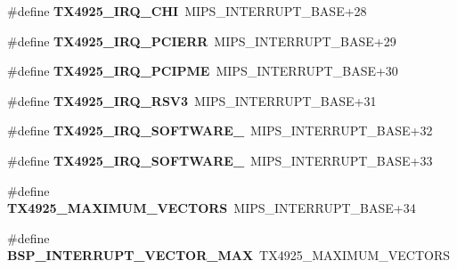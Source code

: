 \begin{DoxyCompactItemize}
\#define {\bfseries T\+X4925\+\_\+\+I\+R\+Q\+\_\+\+C\+HI}~M\+I\+P\+S\+\_\+\+I\+N\+T\+E\+R\+R\+U\+P\+T\+\_\+\+B\+A\+SE+28
\item 
\mbox{\label{group__bsp__interrupt_ga0ef296517039f7d75214c2108f10d716}} 
\#define {\bfseries T\+X4925\+\_\+\+I\+R\+Q\+\_\+\+P\+C\+I\+E\+RR}~M\+I\+P\+S\+\_\+\+I\+N\+T\+E\+R\+R\+U\+P\+T\+\_\+\+B\+A\+SE+29
\item 
\mbox{\label{group__bsp__interrupt_ga5e43a96e8331dd878c89236eb999cbb0}} 
\#define {\bfseries T\+X4925\+\_\+\+I\+R\+Q\+\_\+\+P\+C\+I\+P\+ME}~M\+I\+P\+S\+\_\+\+I\+N\+T\+E\+R\+R\+U\+P\+T\+\_\+\+B\+A\+SE+30
\item 
\mbox{\label{group__bsp__interrupt_gaf8b8981d932d03a544c6e36b7358de58}} 
\#define {\bfseries T\+X4925\+\_\+\+I\+R\+Q\+\_\+\+R\+S\+V3}~M\+I\+P\+S\+\_\+\+I\+N\+T\+E\+R\+R\+U\+P\+T\+\_\+\+B\+A\+SE+31
\item 
\mbox{\label{group__bsp__interrupt_gac11a3236c9c6721ab92f357ca16b8afa}} 
\#define {\bfseries T\+X4925\+\_\+\+I\+R\+Q\+\_\+\+S\+O\+F\+T\+W\+A\+R\+E\+\_}~M\+I\+P\+S\+\_\+\+I\+N\+T\+E\+R\+R\+U\+P\+T\+\_\+\+B\+A\+SE+32
\item 
\mbox{\label{group__bsp__interrupt_gad6723282313b232746deca37a81d609a}} 
\#define {\bfseries T\+X4925\+\_\+\+I\+R\+Q\+\_\+\+S\+O\+F\+T\+W\+A\+R\+E\+\_}~M\+I\+P\+S\+\_\+\+I\+N\+T\+E\+R\+R\+U\+P\+T\+\_\+\+B\+A\+SE+33
\item 
\mbox{\label{group__bsp__interrupt_gad30edaaa14c1708d2dfec5251de70aaa}} 
\#define {\bfseries T\+X4925\+\_\+\+M\+A\+X\+I\+M\+U\+M\+\_\+\+V\+E\+C\+T\+O\+RS}~M\+I\+P\+S\+\_\+\+I\+N\+T\+E\+R\+R\+U\+P\+T\+\_\+\+B\+A\+SE+34
\item 
\mbox{\label{group__bsp__interrupt_gae4a2cdda5816a4c83c2fac0a49880c6e}} 
\#define {\bfseries B\+S\+P\+\_\+\+I\+N\+T\+E\+R\+R\+U\+P\+T\+\_\+\+V\+E\+C\+T\+O\+R\+\_\+\+M\+AX}~T\+X4925\+\_\+\+M\+A\+X\+I\+M\+U\+M\+\_\+\+V\+E\+C\+T\+O\+RS
\item 
\mbox{\label{group__bsp__interrupt_ga64cbb02dfea4d6923abccaa0087d2a0d}} 

\end{DoxyCompactItemize}
